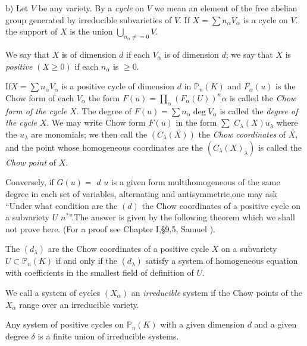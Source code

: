 {b) Let $V$ be any variety. By a \textit{cycle} on $V$ we mean an
element of the free abelian group generated by irreducible subvarieties of
$V$. If $X=\sum n_\alpha V_\alpha$ is a cycle on $V$. the support of
$X$ is the union $\bigcup\limits_{n_\alpha \neq=0}V$. 

We say that $X$ is of dimension $d$ if each  $V_\alpha$ is of
dimension $d$; we say that $X$ is
\textit{positive} $(X \geq 0)$ if each $n_\alpha$ is $\geq 0$. 

If\pageoriginale $X=\sum n_\alpha V_\alpha $ is a positive cycle of dimension $d$
in $\mathbb{P}_n(K)$ and  $F_\alpha (u)$ is the Chow form of each
$V_\alpha$ the form $F(u)=\prod\limits_{\alpha }(F_\alpha (U))^n
\alpha$ is called the \textit{Chow form of the cycle $X$}. The
degree of $F(u)=\sum n_\alpha \deg V_\alpha $ is called the
\textit{degree of the cycle} $X$. We may write Chow form $F(u)$ in the
form $\sum$ $C_\lambda (X)u_\lambda$ where the $u_\lambda$ are monomials; we then call the  $(C_\lambda
(X))$ the \textit{Chow coordinates} of $X$, and the point whose
homogeneous coordinates are the $(C_\lambda (X)_\lambda)$ is called
the \textit{Chow point} of $X$.  

Conversely, if $G(u)=$ $d$ $u$ is a given form multihomogeneous of the
same degree in each set of variables, alternating and antisymmetric,one
may ask ``Under what condition are the $(d)$ the Chow  coordinates of a
positive cycle on a subvariety $U$  $n^?$''.The answer is given by the
following theorem which we shall not prove here. (For a proof see
Chapter I,\S 9,5, Samuel \cite{4}). 

\begin{theorem*}%
  The $(d_\lambda)$ are the Chow coordinates of a positive cycle $X$
  on a subvariety $U \subset \mathbb{P}_n(K)$ if and only if the
  $(d_\lambda)$ satisfy a system of homogeneous equation with
  coefficients in the smallest field of definition of $U$. 
\end{theorem*}

We call a system of cycles $(X_\alpha )$ an \textit{irreducible}
system if the Chow points of the $X_\alpha $ range over an irreducible
variety. 

\begin{coro*}%
  Any system of positive cycles on $\mathbb{P}_n(K)$ with a given
  dimension  $d$ and a given degree $\delta$ is a finite union  of
  irreducible systems. 
\end{coro*}

\begin{example*}%
~


\end{example*}}

